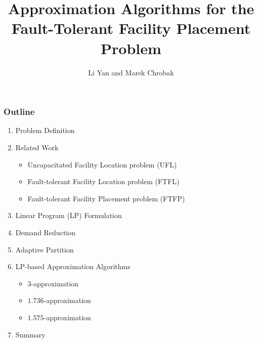 \documentclass[handout, hyperref, xcolor=dvipsnames]{beamer}
\title[FTFP]{Approximation Algorithms
  for the Fault-Tolerant Facility Placement Problem}
\author[lyan,marek]{Li Yan and Marek Chrobak}
\institute[UCR]{
  Computer Science\\
  University of California Riverside\\
}
\date{}
\begin{document}
\begin{frame}
  \titlepage
\end{frame}

\begin{frame}
  \frametitle{Outline}
  \begin{enumerate}

  \item Problem Definition

  \item Related Work
    \begin{itemize}
    \item Uncapacitated Facility Location problem (UFL)
    \item Fault-tolerant Facility Location problem (FTFL)
    \item Fault-tolerant Facility Placement problem (FTFP)
    \end{itemize}

  \item Linear Program (LP) Formulation

  \item Demand Reduction

  \item Adaptive Partition

  \item LP-based Approximation Algorithms
      \begin{itemize}
        \item $3$-approximation
        \item $1.736$-approximation
        \item $1.575$-approximation
        \end{itemize}

  \item{Summary}
  \end{enumerate}
\end{frame}
\end{document}

